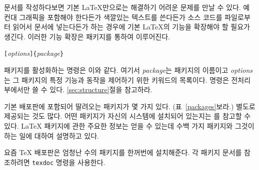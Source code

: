 문서를 작성하다보면 기본 \LaTeX 만으로는 해결하기 어려운 문제를 만날 수 있다.
예컨대 그래픽을 포함해야 한다든가 색깔있는 텍스트를 쓴다든가 소스 코드를 파일로부터 읽어서 문서에 넣는다든가
하는 경우에 기본 \LaTeX 의 기능을 확장해야 할 필요가 생긴다.
이러한 기능 확장은 패키지를 통하여 이루어진다.
\begin{lscommand}
\verb|[|\emph{options}\verb|]{|\emph{package}\verb|}|
\end{lscommand}
\noindent 패키지를 활성화하는 명령은 이와 같다. 여기서 \emph{package}는 패키지의 이름이고
\emph{options}는 그 패키지의 특정 기능과 동작을 제어하기 위한 키워드의 목록이다.
 명령은 전처리부에서만 쓸 수 있다. \ref{sec:structure}절을 참고하라.

\LaTeXe{} 기본 배포판에 포함되어 딸려오는 패키지가 몇 가지 있다. (표~\ref{packages}\를 보라.)
별도로 제공되는 것도 많다. 어떤 패키지가 자신의 시스템에 설치되어 있는지는 \guide 를 참고할 수 있다.
\LaTeX{} 패키지에 관한 주요한 정보는  얻을 수 있는데 수백 가지 패키지와 그것이 하는 일에 대하여 설명하고 있다.

요즘 \TeX{} 배포판은 엄청난 수의 패키지를 한꺼번에 설치해준다. 각 패키지 문서를 참조하려면 \texttt{texdoc}
명령을 사용한다.

